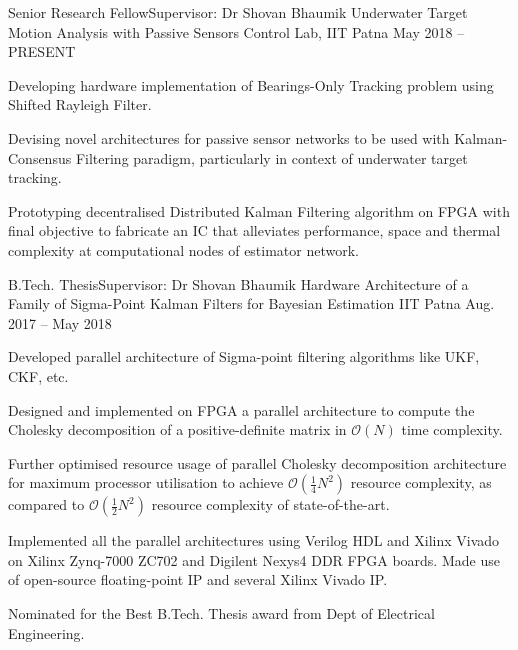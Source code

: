 
\begin{cventries}

\cventry
	{Senior Research Fellow\quad\textbar\quad Supervisor: Dr Shovan Bhaumik} %
	{Underwater Target Motion Analysis with Passive Sensors} %
	{Control Lab, IIT Patna} %
	{May 2018 -- PRESENT} %
	{\begin{cvitems} %
		\item {Developing hardware implementation of Bearings-Only Tracking problem using Shifted Rayleigh Filter.}
		\item {Devising novel architectures for passive sensor networks to be used with Kalman-Consensus Filtering paradigm, particularly in context of underwater target tracking.}
		\item {Prototyping decentralised Distributed Kalman Filtering algorithm on FPGA with final objective to fabricate an IC that alleviates performance, space and thermal complexity at computational nodes of estimator network.}
	\end{cvitems}}

\cventry
	{B.Tech. Thesis\quad\textbar\quad Supervisor: Dr Shovan Bhaumik} %
	{Hardware Architecture of a Family of Sigma-Point Kalman Filters for Bayesian Estimation} %
	{IIT Patna} %
	{Aug. 2017 -- May 2018} %
	{\begin{cvitems} %
		\item {Developed parallel architecture of Sigma-point filtering algorithms like UKF, CKF, etc.}
		\item {Designed and implemented on FPGA a parallel architecture to compute the Cholesky decomposition of a positive-definite matrix in $\mathcal{O} \left( N \right)$ time complexity.}
		\item {Further optimised resource usage of parallel Cholesky decomposition architecture for maximum processor utilisation to achieve $\mathcal{O} \left( \frac{1}{4} N^2 \right)$ resource complexity, as compared to $\mathcal{O} \left( \frac{1}{2} N^2 \right)$ resource complexity of state-of-the-art.}
		\item {Implemented all the parallel architectures using Verilog HDL and Xilinx Vivado on Xilinx Zynq-7000 ZC702 and Digilent Nexys4 DDR FPGA boards. Made use of open-source floating-point IP and several Xilinx Vivado IP.}
		\item {Nominated for the Best B.Tech. Thesis award from Dept of Electrical Engineering.}
	\end{cvitems}}

\end{cventries}
